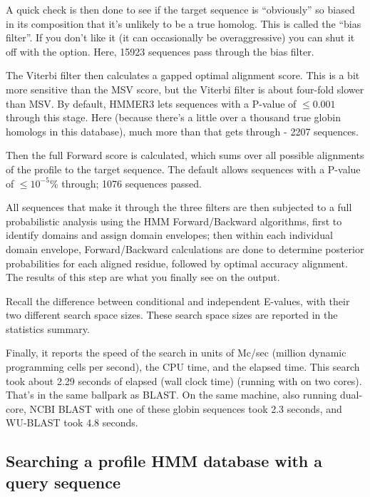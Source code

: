 A quick check is then done to see if the target sequence is
``obviously'' so biased in its composition that it's unlikely to be a
true homolog. This is called the ``bias filter''. If you don't like it
(it can occasionally be overaggressive) you can shut it off with the
 option. Here, 15923 sequences pass through the bias
filter.

The Viterbi filter then calculates a gapped optimal alignment score.
This is a bit more sensitive than the MSV score, but the Viterbi
filter is about four-fold slower than MSV. By default, HMMER3 lets
sequences with a P-value of $\leq 0.001$ through this stage. Here
(because there's a little over a thousand true globin homologs in this
database), much more than that gets through - 2207 sequences.

Then the full Forward score is calculated, which sums over all
possible alignments of the profile to the target sequence. The default
allows sequences with a P-value of $\leq 10^{-5}$\% through; 1076
sequences passed.

All sequences that make it through the three filters are then
subjected to a full probabilistic analysis using the HMM
Forward/Backward algorithms, first to identify domains and assign
domain envelopes; then within each individual domain envelope,
Forward/Backward calculations are done to determine posterior
probabilities for each aligned residue, followed by optimal accuracy
alignment. The results of this step are what you finally see on the
output.

Recall the difference between conditional and independent E-values,
with their two different search space sizes. These search space sizes
are reported in the statistics summary.

Finally, it reports the speed of the search in units of Mc/sec
(million dynamic programming cells per second), the CPU time, and the
elapsed time. This search took about 2.29 seconds of elapsed (wall
clock time) (running with  on two cores). That's in the
same ballpark as BLAST. On
the same machine, also running dual-core, NCBI BLAST with one of these
globin sequences took 2.3 seconds, and WU-BLAST took 4.8 seconds.

\subsection{Searching a profile HMM database with a query sequence}

